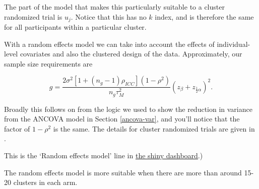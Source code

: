 \documentclass[
  openany]{book}
\theoremstyle{definition}
\theoremstyle{definition}
\theoremstyle{definition}
\theoremstyle{definition}
\theoremstyle{remark}
\begin{document}
The part of the model that makes this particularly suitable to a cluster randomized trial is \(u_{j}\). Notice that this has no \(k\) index, and is therefore the same for all participants within a particular cluster.

With a random effects model we can take into account the effects of individual-level covariates and also the clustered design of the data. Approximately, our sample size requirements are

\[
g = \frac{2 \sigma^2 \left[1+ \left(n_g-1\right)\rho_{ICC}\right]\left(1-\rho^2\right) }{n_g\tau^2_M}\left(z_{\beta} + z_{\frac{1}{2}\alpha}\right)^2.
\]

Broadly this follows on from the logic we used to show the reduction in variance from the ANCOVA model in Section \ref{ancova-var}, and you'll notice that the factor of \(1-\rho^2\) is the same. The details for cluster randomized trials are given in \citet{teerenstra2012simple}.

This is the `Random effects model' line in \href{https://racheloughton.shinyapps.io/sample_size/?_ga=2.190583720.2013007057.1679308387-1261352122.1678702192}{the shiny dashboard}.)

The random effects model is more suitable when there are more than around 15-20 clusters in each arm.
\end{document}
